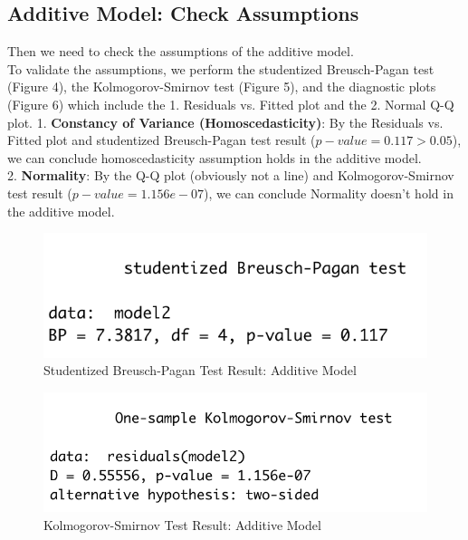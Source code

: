\documentclass[11pt,a4paper]{article}
\begin{document}
\subsection{Additive Model: Check Assumptions}
Then we need to check the assumptions of the additive model.\\
To validate the assumptions, we perform the studentized Breusch-Pagan test (Figure 4), the Kolmogorov-Smirnov test (Figure 5), and the diagnostic plots (Figure 6) which include the 1. Residuals vs. Fitted plot and the 2. Normal Q-Q plot.
1. \textbf{Constancy of Variance (Homoscedasticity)}: By the Residuals vs. Fitted plot and studentized Breusch-Pagan test result ($p-value=0.117>0.05$), we can conclude homoscedasticity assumption holds in the additive model.\\
2. \textbf{Normality}: By the Q-Q plot (obviously not a line) and Kolmogorov-Smirnov test result ($p-value=1.156e-07$), we can conclude Normality doesn't hold in the additive model.
\begin{figure}[htb]
    \centering
    \includegraphics[scale=1]{BP1}
    \caption{Studentized Breusch-Pagan Test Result: Additive Model}
    \label{}
\end{figure}
\begin{figure}[htb]
    \centering
    \includegraphics[scale=1]{KS1}
    \caption{Kolmogorov-Smirnov Test Result: Additive Model}
    \label{}
\end{figure}
\end{document}

